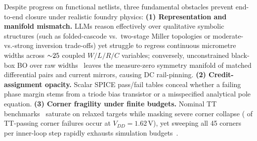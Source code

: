 \documentclass{article}
\theoremstyle{plain}
\begin{document}
Despite progress on functional netlists, three fundamental obstacles prevent end-to-end closure under realistic foundry physics:
\textbf{(1) Representation and manifold mismatch.} LLMs reason effectively over qualitative symbolic structures (such as folded-cascode vs.\ two-stage Miller topologies or moderate-vs.-strong inversion trade-offs) yet struggle to regress continuous micrometre widths across ${\sim}25{}$ coupled $W/L/R/C$ variables; conversely, unconstrained black-box BO over raw widths~\citep{lai2026analogcoderpro} leaves the measure-zero symmetry manifold of matched differential pairs and current mirrors, causing DC rail-pinning.
\textbf{(2) Credit-assignment opacity.} Scalar SPICE pass/fail tables conceal whether a failing phase margin stems from a triode bias transistor or a misspecified analytical pole equation.
\textbf{(3) Corner fragility under finite budgets.} Nominal TT benchmarks~\citep{lai2025analogcoder,habib2026aallm} saturate on relaxed targets while masking severe corner collapse (\PVTFailLowVdd{} of TT-passing corner failures occur at $V_{DD}=1.62\,\mathrm{V}$), yet sweeping all 45 corners per inner-loop step rapidly exhausts simulation budgets~\citep{adbench2026longhorizon}.
\end{document}
